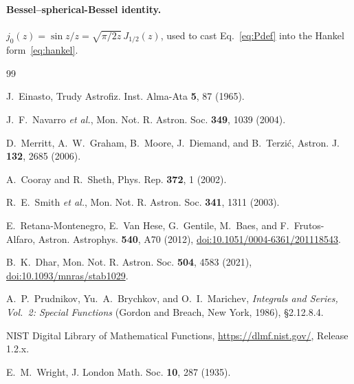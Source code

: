 \documentclass[aps,prd,onecolumn]{revtex4-2}
\begin{document}
\paragraph*{Bessel--spherical-Bessel identity.}
$j_0(z)=\sin z/z=\sqrt{\pi/2z}\,J_{1/2}(z)$, used to cast
Eq.~\eqref{eq:Pdef} into the Hankel form~\eqref{eq:hankel}.

\begin{thebibliography}{99}

J.~Einasto,
Trudy Astrofiz. Inst. Alma-Ata \textbf{5}, 87 (1965).

J.~F.~Navarro \emph{et al.},
Mon. Not. R. Astron. Soc. \textbf{349}, 1039 (2004).

D.~Merritt, A.~W.~Graham, B.~Moore, J.~Diemand, and B.~Terzi\'c,
Astron. J. \textbf{132}, 2685 (2006).

A.~Cooray and R.~Sheth,
Phys. Rep. \textbf{372}, 1 (2002).

R.~E.~Smith \emph{et al.},
Mon. Not. R. Astron. Soc. \textbf{341}, 1311 (2003).

E.~Retana-Montenegro, E.~Van Hese, G.~Gentile, M.~Baes, and
F.~Frutos-Alfaro,
Astron. Astrophys. \textbf{540}, A70 (2012),
\href{https://doi.org/10.1051/0004-6361/201118543}{doi:10.1051/0004-6361/201118543}.

B.~K.~Dhar,
Mon. Not. R. Astron. Soc. \textbf{504}, 4583 (2021),
\href{https://doi.org/10.1093/mnras/stab1029}{doi:10.1093/mnras/stab1029}.

A.~P.~Prudnikov, Yu.~A.~Brychkov, and O.~I.~Marichev,
\emph{Integrals and Series, Vol.~2: Special Functions}
(Gordon and Breach, New York, 1986), \S2.12.8.4.

NIST Digital Library of Mathematical Functions,
\url{https://dlmf.nist.gov/}, Release 1.2.x.

E.~M.~Wright,
J. London Math. Soc. \textbf{10}, 287 (1935).

\end{thebibliography}
\end{document}
